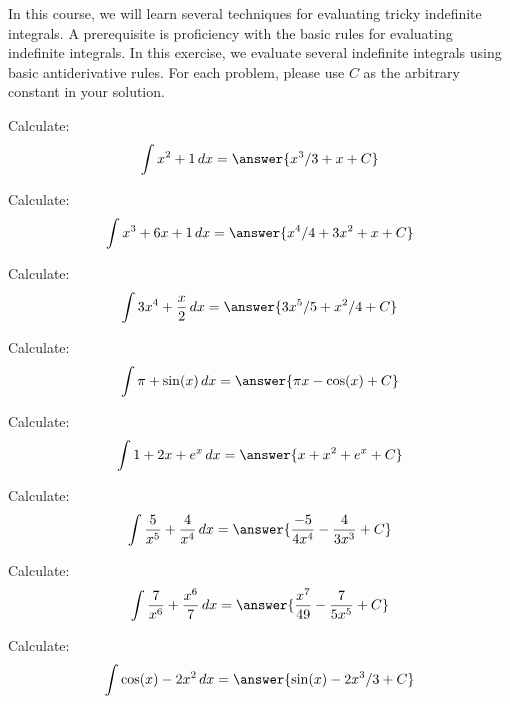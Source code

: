 \documentclass{ximera}
\author{}
\begin{document}
\begin{exercise}

In this course, we will learn several techniques for evaluating tricky indefinite integrals. A prerequisite is proficiency with the basic rules for evaluating indefinite integrals. In this exercise, we evaluate several indefinite integrals using basic antiderivative rules. For each problem, please use $C$ as the arbitrary constant in your solution.

\begin{problem} Calculate:
\[
\int x^2 +1 \d x = \answer{x^3/3 + x+ C}
\]

\end{problem}

\begin{problem} Calculate:
\[
\int x^3 +6 x + 1 \d x = \answer{x^4/4 + 3x^2 + x+ C}
\]

\end{problem}


\begin{problem} Calculate:
\[
\int 3x^4 + \frac{x}{2} \d x = \answer{3x^5/5 + x^2/4 + C}
\]

\end{problem}



\begin{problem} Calculate:
\[
\int \pi + \sin(x) \d x = \answer{\pi x - \cos(x)+ C}
\]

\end{problem}


\begin{problem} Calculate:
\[
\int 1+ 2x + e^x \d x = \answer{x + x^2 + e^x+C}
\]

\end{problem}

\begin{problem} Calculate:
\[
\int \frac{5}{x^5} + \frac{4}{x^4} \d x = \answer{\frac{-5}{4 x^4}-\frac{4}{3 x^3}+C}
\]

\end{problem}


\begin{problem} Calculate:
\[
\int \frac{7}{x^6} + \frac{x^6}{7} \d x = \answer{\frac{x^7}{49}-\frac{7}{5 x^5}+C}
\]

\end{problem}


\begin{problem} Calculate:
\[
\int \cos(x) - 2x^2 \d x = \answer{\sin(x) - 2x^3/3+C}
\]

\end{problem}


\end{exercise}
\end{document}
